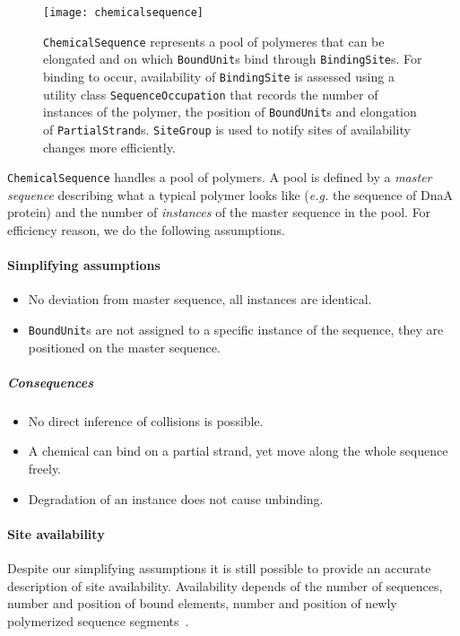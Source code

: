 \begin{figure}[!h]
  \centering
  \texttt{[image: chemicalsequence]}
  \caption{\texttt{ChemicalSequence} represents a pool of polymeres that can be elongated and on which \texttt{BoundUnit}s bind through \texttt{BindingSite}s. For binding to occur, availability of \texttt{BindingSite} is assessed using a utility class \texttt{SequenceOccupation} that records the number of instances of the polymer, the position of \texttt{BoundUnit}s and elongation of \texttt{PartialStrand}s. \texttt{SiteGroup} is used to notify sites of availability changes more efficiently.}
  \label{fig:chemical_sequence}
\end{figure}

\texttt{ChemicalSequence} handles a pool of polymers. A pool is defined by a \emph{master sequence} describing what a typical polymer looks like (\textit{e.g.} the sequence of DnaA protein) and the number of \emph{instances} of the master sequence in the pool. For efficiency reason, we do the following assumptions.

\paragraph{Simplifying assumptions}
\begin{itemize}
\item No deviation from master sequence, all instances are identical.
\item \texttt{BoundUnit}s are not assigned to a specific instance of the sequence, they are positioned on the  master sequence.
\end{itemize}

\subparagraph{Consequences}
\begin{itemize}
\item No direct inference of collisions is possible.
\item A chemical can bind on a partial strand, yet move along the whole sequence freely.
\item Degradation of an instance does not cause unbinding.
\end{itemize}

\paragraph{Site availability}
Despite our simplifying assumptions it is still possible to provide an accurate description of site availability. Availability depends of the number of sequences, number and position of bound elements, number and position of newly polymerized sequence segments~.

